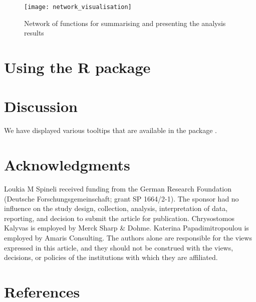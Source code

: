 \begin{figure}
\texttt{[image: network\_visualisation]} \caption{Network of functions for summarising and presenting the analysis results}\label{fig:network-visualisation}
\end{figure}

\hypertarget{using-the-r-package}{%
\section{\texorpdfstring{Using the  R package}{Using the  R package}}\label{using-the-r-package}}

\hypertarget{discussion}{%
\section{Discussion}\label{discussion}}

We have displayed various tooltips that are available in the package .

\hypertarget{acknowledgments}{%
\section{Acknowledgments}\label{acknowledgments}}

Loukia M Spineli received funding from the German Research Foundation (Deutsche
Forschungsgemeinschaft; grant SP 1664/2-1). The sponsor had no influence on the
study design, collection, analysis, interpretation of data, reporting, and decision
to submit the article for publication. Chrysostomos Kalyvas is employed by Merck
Sharp \& Dohme. Katerina Papadimitropoulou is employed by Amaris Consulting. The
authors alone are responsible for the views expressed in this article, and they
should not be construed with the views, decisions, or policies of the institutions
with which they are affiliated.

\hypertarget{references}{%
\section*{References}\label{references}}

